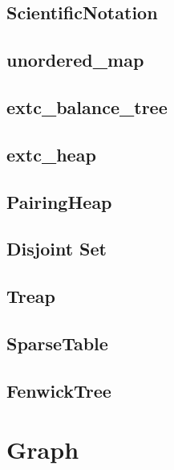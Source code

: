 \documentclass[a4paper,10pt,twocolumn,oneside]{article}
\begin{document}
\subsection{ScientificNotation}


\subsection{unordered\_map}


\subsection{extc\_balance\_tree}


\subsection{extc\_heap}


\subsection{PairingHeap}


\subsection{Disjoint Set}


\subsection{Treap}


\subsection{SparseTable}


\subsection{FenwickTree}


\section{Graph}
\end{document}
